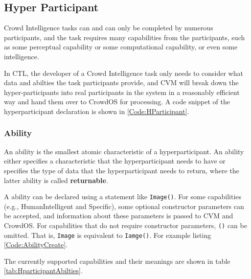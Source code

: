 


\subsection{Hyper Participant}
Crowd Intelligence tasks can and can only be completed by numerous participants, and the task requires many capabilities from the participants, such as some perceptual capability or some computational capability, or even some intelligence.

In CTL, the developer of a Crowd Intelligence task only needs to consider what data and abilties the task participants provide, and CVM will break down the hyper-participants into real participants in the system in a reasonably efficient way and hand them over to CrowdOS for processing. A code snippet of the hyperparticipant declaration is shown in \ref{Code:HParticipant}.



\subsubsection{Ability}
An ability is the smallest atomic characteristic of a hyperparticipant. An ability either specifies a characteristic that the hyperparticipant needs to have or specifies the type of data that the hyperparticipant needs to return, where the latter ability is called \textbf{returnable}.

A ability can be declared using a statement like \texttt{Image()}. For some capabilities (e.g., HumanIntelligent and Specific), some optional constructor parameters can be accepted, and information about these parameters is passed to CVM and CrowdOS. For capabilities that do not require constructor parameters, \texttt{()} can be omitted. That is, \texttt{Image} is equivalent to \texttt{Iamge()}. For example listing \ref{Code:AbilityCreate}.



The currently supported capabilities and their meanings are shown in table \ref{tab:HparticipantAbilties}.

